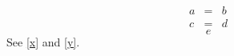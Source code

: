 
\begin{eqnarray}\label{x}
a&=&b\nonumber\\
c&=&d
\end{eqnarray}
\begin{equation}\label{y} e \end{equation}
See \ref{x} and \ref{y}.

